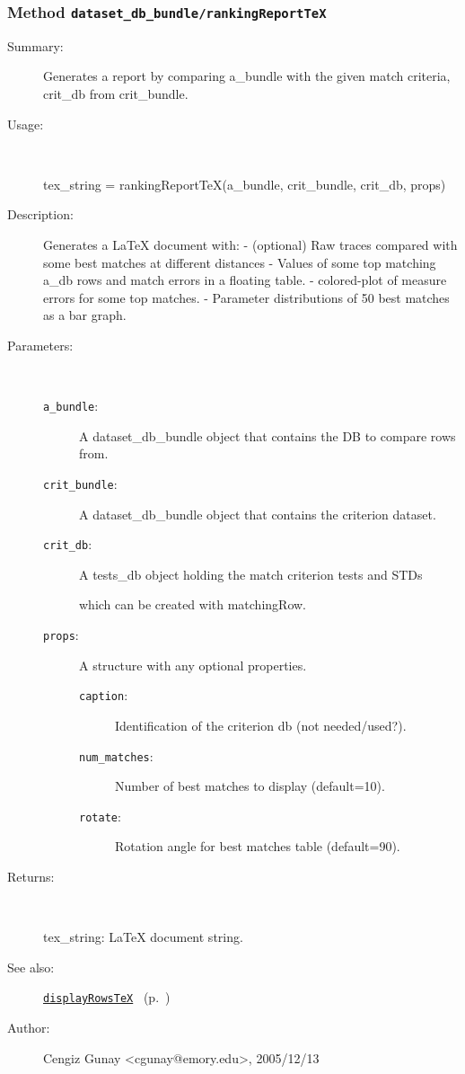 \subsubsection[Method \texttt{rankingReportTeX}]{Method \texttt{dataset\_db\_bundle/rankingReportTeX}}%
%
\label{ref_dataset_db_bundle__rankingReportTeX}%
\hypertarget{ref_dataset_db_bundle__rankingReportTeX}{}%
\begin{description}
\item[Summary:]Generates a report by comparing a\_bundle with the given match criteria, crit\_db from crit\_bundle.
%
\item[Usage:]~%
\begin{lyxcode}%
tex\_string = rankingReportTeX(a\_bundle, crit\_bundle, crit\_db, props)
%
\end{lyxcode}%
%
\item[Description:]%
Generates a LaTeX document with:
	- (optional) Raw traces compared with some best matches at different distances
	- Values of some top matching a\_db rows and match errors in a floating table.
	- colored-plot of measure errors for some top matches.
	- Parameter distributions of 50 best matches as a bar graph.
\item[Parameters:]~
\begin{description}%
\item[\texttt{a\_bundle}:]
 A dataset\_db\_bundle object that contains the DB to compare rows from.
\item[\texttt{crit\_bundle}:]
 A dataset\_db\_bundle object that contains the criterion dataset.
\item[\texttt{crit\_db}:]
 A tests\_db object holding the match criterion tests and STDs

which can be created with matchingRow.
\item[\texttt{props}:]
 A structure with any optional properties.
\begin{description}%
\item[\texttt{caption}:]
 Identification of the criterion db (not needed/used?).
\item[\texttt{num\_matches}:]
 Number of best matches to display (default=10).
\item[\texttt{rotate}:]
 Rotation angle for best matches table (default=90).
\end{description}%
\end{description}%
%
\item[Returns:
]~

	tex\_string: LaTeX document string.
%
%
\item[See also:]%
\hyperlink{ref_displayRowsTeX}{\texttt{displayRowsTeX}}%
\ (p.~\pageref{ref_displayRowsTeX})%
%
%
\item[Author:]%
Cengiz Gunay <cgunay@emory.edu>, 2005/12/13
%
\end{description}
\methodline%

